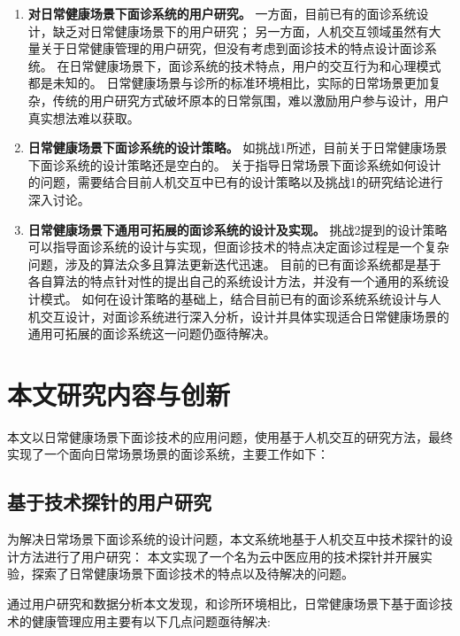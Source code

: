 \begin{enumerate}
    \item \textbf{对日常健康场景下面诊系统的用户研究。}
    一方面，目前已有的面诊系统设计，缺乏对日常健康场景下的用户研究；
    另一方面，人机交互领域虽然有大量关于日常健康管理的用户研究，但没有考虑到面诊技术的特点设计面诊系统。
    在日常健康场景下，面诊系统的技术特点，用户的交互行为和心理模式都是未知的。
    日常健康场景与诊所的标准环境相比，实际的日常场景更加复杂，传统的用户研究方式破坏原本的日常氛围，难以激励用户参与设计，用户真实想法难以获取。

    \item \textbf{日常健康场景下面诊系统的设计策略。}
    如挑战1所述，目前关于日常健康场景下面诊系统的设计策略还是空白的。
    关于指导日常场景下面诊系统如何设计的问题，需要结合目前人机交互中已有的设计策略以及挑战1的研究结论进行深入讨论。

    \item \textbf{日常健康场景下通用可拓展的面诊系统的设计及实现。}
    挑战2提到的设计策略可以指导面诊系统的设计与实现，但面诊技术的特点决定面诊过程是一个复杂问题，涉及的算法众多且算法更新迭代迅速。
    目前的已有面诊系统都是基于各自算法的特点针对性的提出自己的系统设计方法，并没有一个通用的系统设计模式。
    如何在设计策略的基础上，结合目前已有的面诊系统系统设计与人机交互设计，对面诊系统进行深入分析，设计并具体实现适合日常健康场景的通用可拓展的面诊系统这一问题仍亟待解决。
    
\end{enumerate}

\section{本文研究内容与创新}

本文以日常健康场景下面诊技术的应用问题，使用基于人机交互的研究方法，最终实现了一个面向日常场景场景的面诊系统，主要工作如下：

\subsection{基于技术探针的用户研究}

为解决日常场景下面诊系统的设计问题，本文系统地基于人机交互中技术探针的设计方法进行了用户研究：
本文实现了一个名为云中医应用的技术探针并开展实验，探索了日常健康场景下面诊技术的特点以及待解决的问题。

通过用户研究和数据分析本文发现，和诊所环境相比，日常健康场景下基于面诊技术的健康管理应用主要有以下几点问题亟待解决: 

